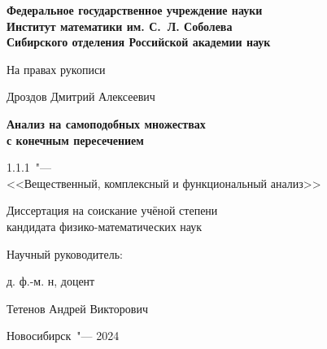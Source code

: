 \thispagestyle{empty}
\begin{center}
\textbf{
Федеральное государственное учреждение науки\\
Институт математики им. С.~Л. Соболева\\
Сибирского отделения Российской академии наук}
\end{center}

\vspace{0pt plus4fill}
\begin{flushright}
На правах рукописи
\end{flushright}


\vspace{0pt plus6fill}
\begin{center}
{\large Дроздов Дмитрий Алексеевич}
\end{center}

\vspace{0pt plus1fill}
\begin{center}
\textbf {\large %
Анализ на самоподобных множествах \\
с конечным пересечением}

\vspace{0pt plus2fill} 
{%
1.1.1\ "---\\
<<Вещественный, комплексный и функциональный анализ>>}

\vspace{0pt plus2fill}
Диссертация на соискание учёной степени\\
кандидата физико-математических наук
\end{center}

\vspace{0pt plus4fill}
\noindent\hspace{0.6\textwidth}Научный руководитель:

\noindent\hspace{0.6\textwidth}д. ф.-м. н, доцент

\noindent\hspace{0.6\textwidth}Тетенов Андрей Викторович


\vspace{0pt plus4fill}
{\centering Новосибирск\ "--- 2024\par}